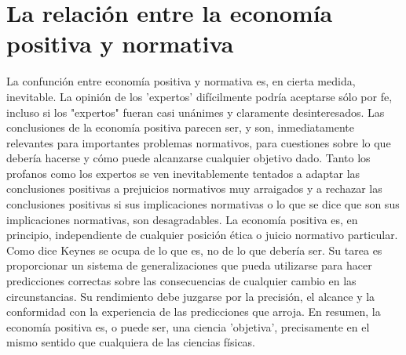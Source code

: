 \section{La relación entre la economía positiva y normativa}
La confunción entre economía positiva y normativa es, en cierta medida, inevitable. La opinión de los 'expertos' difícilmente podría aceptarse sólo por fe, incluso si los "expertos" fueran casi unánimes y claramente desinteresados. Las conclusiones de la economía positiva parecen ser, y son, inmediatamente relevantes para importantes problemas normativos, para cuestiones sobre lo que debería hacerse y cómo puede alcanzarse cualquier objetivo dado. Tanto los profanos como los expertos se ven inevitablemente tentados a adaptar las conclusiones positivas a prejuicios normativos muy arraigados y a rechazar las conclusiones positivas si sus implicaciones normativas o lo que se dice que son sus implicaciones normativas, son desagradables. La economía positiva es, en principio, independiente de cualquier posición ética o juicio normativo particular. Como dice Keynes se ocupa de lo que es, no de lo que debería ser. Su tarea es proporcionar un sistema de generalizaciones que pueda utilizarse para hacer predicciones correctas sobre las consecuencias de cualquier cambio en las circunstancias. Su rendimiento debe juzgarse por la precisión, el alcance y la conformidad con la experiencia de las predicciones que arroja. En resumen, la economía positiva es, o puede ser, una ciencia 'objetiva', precisamente en el mismo sentido que cualquiera de las ciencias físicas.\\
